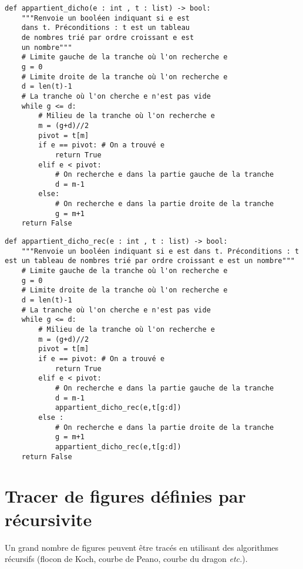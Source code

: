 \noindent\begin{minipage}[c]{.49\linewidth}
\begin{lstlisting}
def appartient_dicho(e : int , t : list) -> bool:
    """Renvoie un booléen indiquant si e est 
    dans t. Préconditions : t est un tableau 
    de nombres trié par ordre croissant e est 
    un nombre"""
    # Limite gauche de la tranche où l'on recherche e
    g = 0 
    # Limite droite de la tranche où l'on recherche e
    d = len(t)-1 
    # La tranche où l'on cherche e n'est pas vide
    while g <= d: 
        # Milieu de la tranche où l'on recherche e
        m = (g+d)//2 
        pivot = t[m]
        if e == pivot: # On a trouvé e
            return True
        elif e < pivot:
            # On recherche e dans la partie gauche de la tranche
            d = m-1 
        else:
            # On recherche e dans la partie droite de la tranche
            g = m+1 
    return False
\end{lstlisting}
\end{minipage} \hfill
\begin{minipage}[c]{.49\linewidth}
\begin{lstlisting}
def appartient_dicho_rec(e : int , t : list) -> bool:
    """Renvoie un booléen indiquant si e est dans t. Préconditions : t est un tableau de nombres trié par ordre croissant e est un nombre"""
    # Limite gauche de la tranche où l'on recherche e
    g = 0 
    # Limite droite de la tranche où l'on recherche e
    d = len(t)-1 
    # La tranche où l'on cherche e n'est pas vide
    while g <= d:
        # Milieu de la tranche où l'on recherche e 
        m = (g+d)//2 
        pivot = t[m]
        if e == pivot: # On a trouvé e
            return True
        elif e < pivot:
            # On recherche e dans la partie gauche de la tranche
            d = m-1 
            appartient_dicho_rec(e,t[g:d])
        else :
            # On recherche e dans la partie droite de la tranche
            g = m+1
            appartient_dicho_rec(e,t[g:d])
    return False
\end{lstlisting}
\end{minipage}

\section{Tracer de figures définies par récursivite}
Un grand nombre de figures peuvent être tracés en utilisant des algorithmes récursifs (flocon de Koch, courbe de Peano, courbe du dragon \textit{etc.}).


